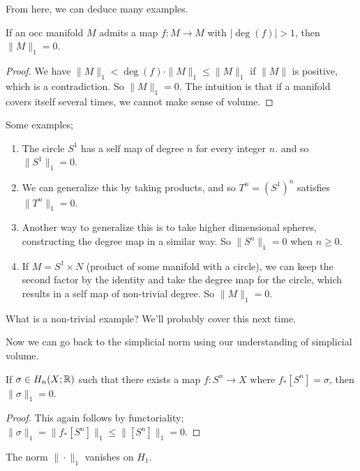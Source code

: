 From here, we can deduce many examples.
\begin{cor}
    If an occ manifold $M$ admits a map $f \colon M \to M$ with $|\deg(f)|>1$, then $\|M\|_1=0$.
\end{cor}
\begin{proof}
    We have $\|M\|_1<\deg (f) \cdot \|M\|_1 \leq \|M\|_1$ if $\|M\|$ is positive, which is a contradiction. So $\|M\|_1=0$. The intuition is that if a manifold covers itself several times, we cannot make sense of volume.
\end{proof}

\begin{example}
    Some examples;
    \begin{enumerate}[label=(\arabic*)]
    \setlength\itemsep{-.2em}
        \item The circle $S^1 $ has a self map of degree $n$ for every integer $n$. and so $\|S^1 \|_1=0$.
        \item We can generalize this by taking products, and so $T^n =(S^1 )^n $ satisfies $\|T^n \|_1=0$.
        \item Another way to generalize this is to take higher dimensional spheres, constructing the degree map in a similar way. So $\|S^n \|_1=0$ when $n\geq 0$.
        \item If $M=S^1  \times N$ (product of some manifold with a circle), we can keep the second factor by the identity and take the degree map for the circle, which results in a self map of non-trivial degree. So $\|M\|_1=0$.
    \end{enumerate}
    What is a non-trivial example? We'll probably cover this next time.
\end{example}
Now we can go back to the simplicial norm using our understanding of simplicial volume.
\begin{lemma}
    If $\sigma \in H_n  (X;\mathbb{R})$ such that there exists a map $f \colon S^n  \to X$ where $f_*[S^n ]=\sigma$, then $\|\sigma\|_1=0$.
\end{lemma}
\begin{proof}
    This again follows by functoriality; $\|\sigma\|_1= \|f_* [S^n ]\|_1 \leq \|[S^n ]\|_1=0$.
\end{proof}
\begin{cor}\label{h1vanish} 
    The norm $\|\cdot \|_1$ vanishes on $H_1$.
\end{cor}
